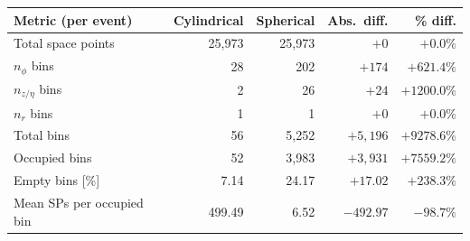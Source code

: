 \renewcommand{\arraystretch}{1.4}
\begin{tabular}{lrrrr}
    \toprule
    \textbf{Metric (per event)} & \textbf{Cylindrical} & \textbf{Spherical} & \textbf{Abs.\ diff.} & \textbf{\% diff.} \\
    \midrule
    \rowcolor{gray!15}
    Total space points & 25{,}973 & 25{,}973 & $+0$ & $+0.0\%$ \\
    $n_\phi$ bins & 28 & 202 & $+174$ & $+621.4\%$ \\
    \rowcolor{gray!15}
    $n_{z/\eta}$ bins & 2 & 26 & $+24$ & $+1200.0\%$ \\
    $n_r$ bins & 1 & 1 & $+0$ & $+0.0\%$ \\
    \rowcolor{gray!15}
    Total bins & 56 & 5{,}252 & $+5{,}196$ & $+9278.6\%$ \\
    Occupied bins & 52 & 3{,}983 & $+3{,}931$ & $+7559.2\%$ \\
    \rowcolor{gray!15}
    Empty bins [\%] & 7.14 & 24.17 & $+17.02$ & $+238.3\%$ \\
    Mean SPs per occupied bin & 499.49 & 6.52 & $-492.97$ & $-98.7\%$ \\
    \bottomrule
\end{tabular}
